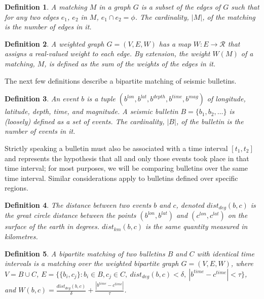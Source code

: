 \documentclass[a4paper,12pt]{article}
\newtheorem{defn}{Definition}
\begin{document}
\begin{defn}
A matching $M$ in a graph $G$ is a subset of the edges of $G$ such
that for any two edges $e_1$, $e_2$ in $M$, $e_1 \cap e_2 = \phi$. The
cardinality, $|M|$, of the matching is the number of edges in it.
\end{defn}

\begin{defn}
A weighted graph $G=(V,E,W)$ has a map $W : E \rightarrow \mathcal{R}$
that assigns a real-valued weight to each edge. By extension, the weight 
$W(M)$ of a matching,
$M$, is defined as the sum of the weights of the edges in it.
\end{defn}

\noindent The next few definitions describe a bipartite matching of seismic
bulletins.

\begin{defn}
An event $b$ is a tuple $(b^{lon}, b^{lat},
b^{depth}, b^{time}, b^{mag})$ of longitude, latitude,
depth, time, and magnitude.
A seismic bulletin $B=\{b_1, b_2,\ldots \}$ is (loosely) defined as a
set of events. The cardinality, $|B|$, of the bulletin is the number of events
in it.
\end{defn}

\noindent Strictly speaking a bulletin must also be associated with a
time interval $[t_1,t_2]$ and represents the
hypothesis that all and only those events took place in that time
interval; for most purposes, we will be comparing bulletins over the
same time interval. Similar considerations apply to bulletins defined
over specific regions.

\begin{defn}
The distance between two events $b$ and $c$, denoted $dist_{deg}(b,c)$ is the
great circle distance between the points $(b^{lon}, b^{lat})$ and
$(c^{lon}, c^{lat})$ on the surface of the earth in
degrees. $dist_{km}(b,c)$ is the same quantity measured in kilometres.
\end{defn}

\begin{defn}
A bipartite matching of two bulletins $B$ and $C$ with identical time
intervals is a matching over the
weighted bipartite graph $G=(V,E,W)$, where $V=B \cup C$, $E=\{\{b_i,
c_j\}: b_i \in B, c_j \in
C,\ dist_{deg}(b,c)<\delta,\ |b^{time}-c^{time}|<\tau \}$, and 
$W(b,c) = \frac{dist_{deg}(b,c)}{\delta} +  \frac{|b^{time} - c^{time}|}{\tau}$.
\end{defn}
\end{document}
